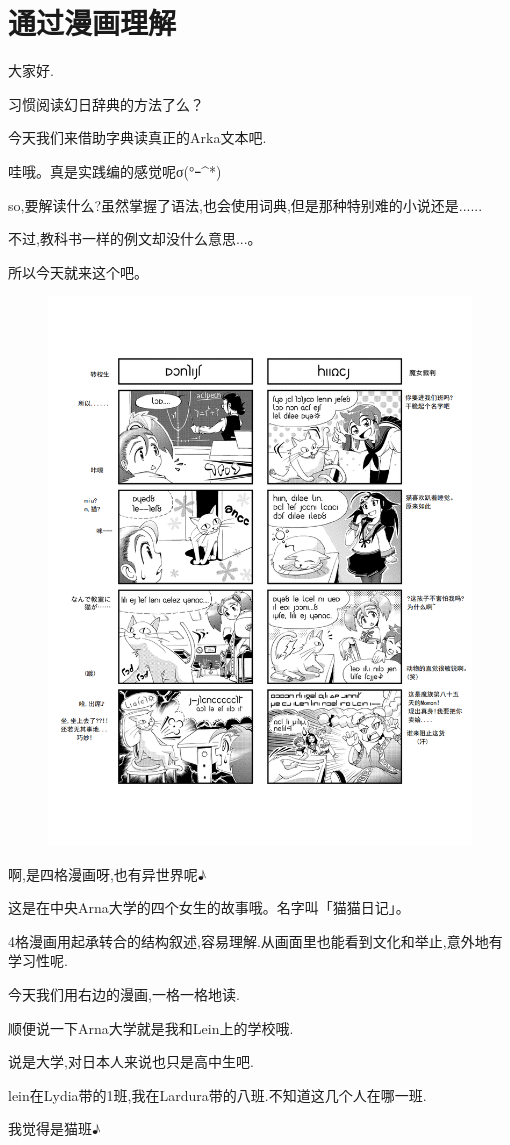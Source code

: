 \section{通过漫画理解}

大家好.

习惯阅读幻日辞典的方法了么？

今天我们来借助字典读真正的Arka文本吧.


哇哦。真是实践编的感觉呢σ(°ｰ\^{}*)

so,要解读什么?虽然掌握了语法,也会使用词典,但是那种特别难的小说还是......

不过,教科书一样的例文却没什么意思...。


所以今天就来这个吧。
\begin{figure}[H]
\includegraphics[width=\textwidth]{pngs/xarl2.png}%
\end{figure}



啊,是四格漫画呀,也有异世界呢♪



这是在中央Arna大学的四个女生的故事哦。名字叫「猫猫日记」。

4格漫画用起承转合的结构叙述,容易理解.从画面里也能看到文化和举止,意外地有学习性呢.

今天我们用右边的漫画,一格一格地读.

顺便说一下Arna大学就是我和Lein上的学校哦.

说是大学,对日本人来说也只是高中生吧.

lein在Lydia带的1班,我在Lardura带的八班.不知道这几个人在哪一班.


我觉得是猫班♪
